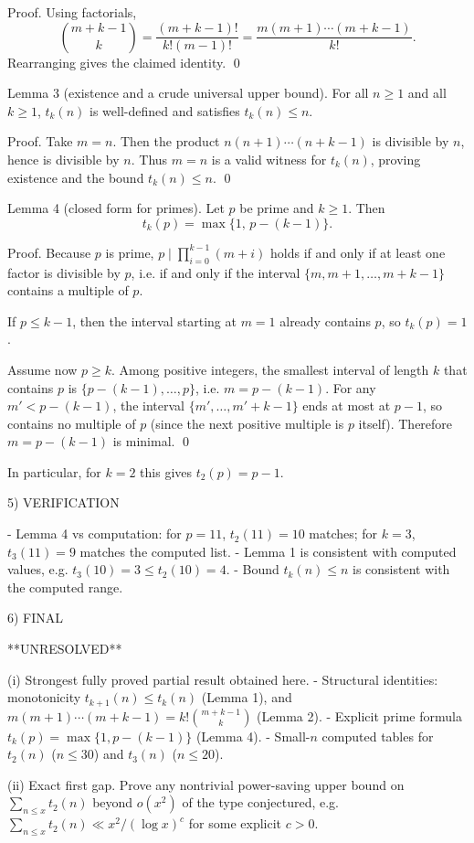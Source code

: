 Proof.
Using factorials,
\[
\binom{m+k-1}{k}=\frac{(m+k-1)!}{k!(m-1)!}=\frac{m(m+1)\cdots(m+k-1)}{k!}.
\]
Rearranging gives the claimed identity. \qed

Lemma 3 (existence and a crude universal upper bound).
For all $n\ge 1$ and all $k\ge 1$, $t_k(n)$ is well-defined and satisfies $t_k(n)\le n$.

Proof.
Take $m=n$. Then the product $n(n+1)\cdots(n+k-1)$ is divisible by $n$, hence is divisible by $n$. Thus $m=n$ is a valid witness for $t_k(n)$, proving existence and the bound $t_k(n)\le n$. \qed

Lemma 4 (closed form for primes).
Let $p$ be prime and $k\ge 1$. Then
\[
 t_k(p)=\max\{1,\,p-(k-1)\}.
\]

Proof.
Because $p$ is prime, $p\mid \prod_{i=0}^{k-1}(m+i)$ holds if and only if at least one factor is divisible by $p$, i.e. if and only if the interval $\{m,m+1,\dots,m+k-1\}$ contains a multiple of $p$.

If $p\le k-1$, then the interval starting at $m=1$ already contains $p$, so $t_k(p)=1$.

Assume now $p\ge k$. Among positive integers, the smallest interval of length $k$ that contains $p$ is $\{p-(k-1),\dots,p\}$, i.e. $m=p-(k-1)$. For any $m'<p-(k-1)$, the interval $\{m',\dots,m'+k-1\}$ ends at most at $p-1$, so contains no multiple of $p$ (since the next positive multiple is $p$ itself). Therefore $m=p-(k-1)$ is minimal. \qed

In particular, for $k=2$ this gives $t_2(p)=p-1$.

5) VERIFICATION

- Lemma 4 vs computation: for $p=11$, $t_2(11)=10$ matches; for $k=3$, $t_3(11)=9$ matches the computed list.
- Lemma 1 is consistent with computed values, e.g. $t_3(10)=3\le t_2(10)=4$.
- Bound $t_k(n)\le n$ is consistent with the computed range.

6) FINAL

**UNRESOLVED**

(i) Strongest fully proved partial result obtained here.
- Structural identities: monotonicity $t_{k+1}(n)\le t_k(n)$ (Lemma 1), and $m(m+1)\cdots(m+k-1)=k!\binom{m+k-1}{k}$ (Lemma 2).
- Explicit prime formula $t_k(p)=\max\{1,p-(k-1)\}$ (Lemma 4).
- Small-$n$ computed tables for $t_2(n)$ ($n\le 30$) and $t_3(n)$ ($n\le 20$).

(ii) Exact first gap.
Prove any nontrivial power-saving upper bound on $\sum_{n\le x} t_2(n)$ beyond $o(x^2)$ of the type conjectured, e.g. $\sum_{n\le x} t_2(n)\ll x^2/(\log x)^c$ for some explicit $c>0$.

